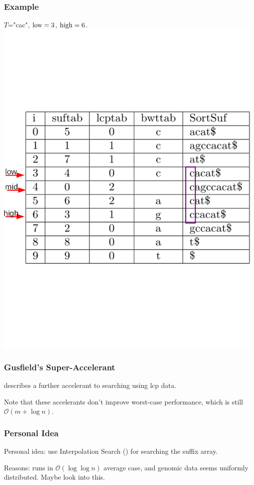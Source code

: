 \documentclass[compress,handout]{beamer} %
\renewcommand{\O}{\mathcal{O}}
\begin{document}
\begin{frame}
	\frametitle{Example}
	$T$="cac", $\hbox{low}=3$, $\hbox{high}=6$.
	\includegraphics[width=\textwidth, height=\textheight, keepaspectratio=true]{esa_lcp_search_1}
\end{frame}

\begin{frame}
	\frametitle{Gusfield's Super-Accelerant}
	\citealt[pp. 152]{gusfield1997algorithms} describes a further
	accelerant to searching using lcp data.

	Note that these accelerants don't improve worst-case performance,
	which is still $\O(m + \log n)$.
\end{frame}

\begin{frame}
	\frametitle{Personal Idea}
	Personal idea: use Interpolation Search
	(\citealt{perl1978interpolation}) for searching the suffix array.

	Reasons: runs in $\O(\log \log n)$ average case, and genomic
	data seems uniformly distributed. Maybe look into this.
\end{frame}
\end{document}
